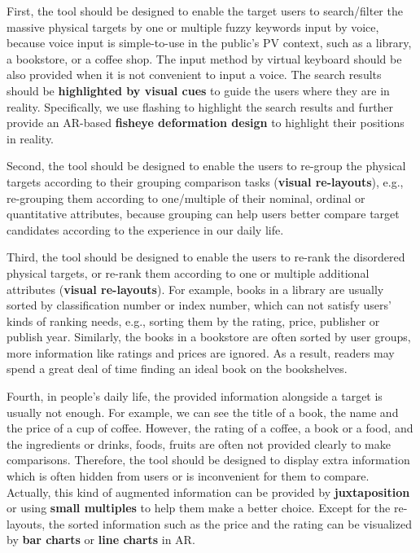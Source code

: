 First, the tool should be designed to enable the target users to search/filter the massive physical targets
by one or multiple fuzzy keywords input by voice, because voice input is simple-to-use in the public's PV context,
such as a library, a bookstore, or a coffee shop.
The input method by virtual keyboard should be also provided when it is not convenient to input a voice.
The search results should be \textbf{highlighted by visual cues} to guide the users where they are in reality.
Specifically, we use flashing to highlight the search results and further
provide an AR-based \textbf{fisheye deformation design} to highlight their positions in reality.

Second, the tool should be designed to enable the users to re-group the physical targets
according to their grouping comparison tasks (\textbf{visual re-layouts}),
e.g., re-grouping them according to one/multiple of their nominal, ordinal or quantitative attributes,
because grouping can help users better compare target candidates according to the experience in our daily life.

Third, the tool should be designed to enable the users to re-rank the disordered physical targets,
or re-rank them according to one or multiple additional attributes (\textbf{visual re-layouts}).
For example, books in a library are usually sorted by classification number or index number,
which can not satisfy users' kinds of ranking needs, e.g., sorting them by the rating, price,
publisher or publish year.
Similarly, the books in a bookstore are often sorted by user groups,
more information like ratings and prices are ignored.
As a result, readers may spend a great deal of time finding an ideal book on the bookshelves.

Fourth, in people's daily life, the provided information alongside a target is usually not enough.
For example, we can see the title of a book, the name and the price of a cup of coffee.
However, the rating of a coffee, a book or a food,
and the ingredients or drinks, foods, fruits are often not provided clearly
to make comparisons.
Therefore, the tool should be designed to display extra information which is often hidden from users
or is inconvenient for them to compare.
Actually, this kind of augmented information can be provided by \textbf{juxtaposition}
or using \textbf{small multiples} to help them make a better choice.
Except for the re-layouts, the sorted information such as the price and the rating can be visualized by
\textbf{bar charts} or \textbf{line charts} in AR.


